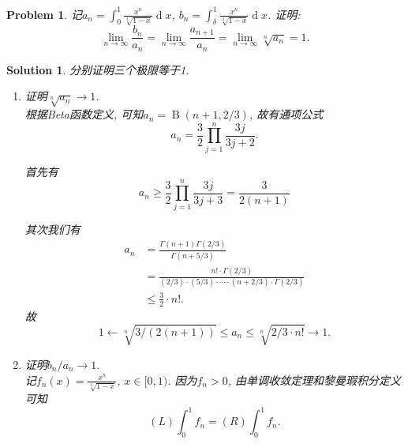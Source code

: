 \documentclass[a4paper, 12pt]{ctexart}
\theoremstyle{plain}
\newtheorem{problem}{Problem}[section]
\theoremstyle{plain}
\theoremstyle{plain}
\theoremstyle{nonumberplain}
\newtheorem{solution}{Solution}
\DeclareMathOperator*{\Beta}{B}
\DeclareMathOperator*{\diff}{d}
\begin{document}
    \begin{problem}
        记$\displaystyle a_n=\int_{0}^{1}{\frac{x^n}{\sqrt[3]{1-x}}\diff x}$,
        $\displaystyle b_n=\int_{\delta}^{1}{\frac{x^n}{\sqrt[3]{1-x}}\diff x}$.
        证明:
        \[\lim_{n\to \infty}{\frac{b_n}{a_n}}=
        \lim_{n\to \infty}{\frac{a_{n+1}}{a_n}}=
        \lim_{n\to \infty}{\sqrt[n]{a_n}}=1.\]
    \end{problem}

    \begin{solution}
        分别证明三个极限等于1.

        \begin{enumerate}[Step i.]
            \item

            证明$\sqrt[n]{a_n}\to 1$.\\
            根据Beta函数定义, 可知$a_n=\Beta(n+1, 2/3)$, 故有通项公式
            \begin{equation}
                a_n = \frac{3}{2}\prod_{j=1}^{n}{\frac{3j}{3j+2}}.
            \end{equation}

            首先有
            \begin{equation}
                \label{angeq}
                a_n
                \geq \frac{3}{2}\prod_{j=1}^{n}{\frac{3j}{3j+3}}
                = \frac{3}{2(n+1)}
            \end{equation}

            其次我们有
            \begin{equation}
            \begin{aligned}
                a_n &= \frac{\Gamma(n+1)\Gamma(2/3)}{\Gamma(n+5/3)}\\
                &= \frac{n!\cdot\Gamma(2/3)}{(2/3)\cdot(5/3)\cdot\dotsm
                    \cdot(n+2/3)\cdot\Gamma(2/3)}\\
                &\leq \frac{3}{2}\cdot n!.
            \end{aligned}
            \end{equation}
            故
            \begin{equation}
                1\leftarrow \sqrt[n]{3/(2(n+1))} \leq a_n
                    \leq \sqrt[n]{2/3\cdot n!} \to 1.
            \end{equation}

            \item

            证明$b_n/a_n\to 1.$\\
            记$\displaystyle f_n(x)=\frac{x^n}{\sqrt[3]{1-x}}$, $x\in [0, 1)$.
            因为$f_n>0$, 由单调收敛定理和黎曼瑕积分定义可知
            \begin{equation}
                (L)\int_{0}^{1}f_n = (R)\int_{0}^{1}f_n.
            \end{equation}


\end{enumerate}
\end{solution}
\end{document}
